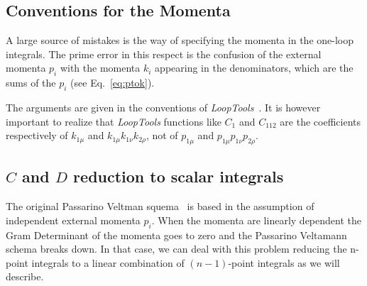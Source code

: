 \subsection{Conventions for the Momenta}

A large source of mistakes is the way of specifying the momenta in the
one-loop integrals.  The prime error in this respect is the confusion of
the external momenta $p_i$ with the momenta $k_i$ appearing in the
denominators, which are the sums of the $p_i$ (see Eq.~\eqref{eq:ptok}).

The arguments are given in the conventions of \textit{LoopTools}~\cite{Hahn:1998yk}.
It is however important to realize that \textit{LoopTools} functions like $C_1$ and
$C_{112}$ are the coefficients respectively of $k_{1\mu}$ and $k_{1\mu}
k_{1\nu} k_{2\rho}$, not of $p_{1\mu}$ and $p_{1\mu} p_{1\nu} p_{2\rho}$.






\subsection{$C$ and $D$ reduction to scalar integrals}
\label{sec:CD-reduction}

The original Passarino Veltman squema~\cite{Passarino:1978jh} is based in the assumption of independent external momenta $p_i$. When the momenta are linearly dependent the Gram Determinant of the momenta goes to zero and the Passarino Veltamann schema breaks down. In that case, we can deal with this problem reducing the n-point integrals to a linear combination of $(n-1)$-point integrals as we will describe.
  

